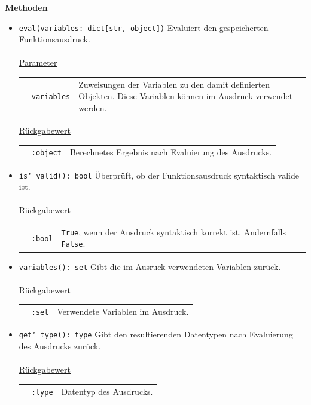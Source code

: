\documentclass{article}
\begin{document}
\textbf{{Methoden}}
\begin{itemize}
\item \texttt{eval(variables: dict[str, object])} \newline Evaluiert den gespeicherten Funktionsausdruck.
\\\\
\underline{{Parameter}}

\begin{tabular}{lll}
 & \texttt{variables} & Zuweisungen der Variablen zu den damit definierten Objekten. Diese Variablen können im Ausdruck verwendet werden. \\
\end{tabular}

\underline{{Rückgabewert}}

\begin{tabular}{lll}
 & \texttt{:object} & Berechnetes Ergebnis nach Evaluierung des Ausdrucks. \\
\end{tabular}

\item \texttt{is\char`_valid(): bool} \newline Überprüft, ob der Funktionsausdruck syntaktisch valide ist.
\\\\
\underline{{Rückgabewert}}

\begin{tabular}{lll}
 & \texttt{:bool} & \texttt{True}, wenn der Ausdruck syntaktisch korrekt ist. Andernfalls \texttt{False}. \\
\end{tabular}

\item \texttt{variables(): set} \newline Gibt die im Ausruck verwendeten Variablen zurück.
\\\\
\underline{{Rückgabewert}}

\begin{tabular}{lll}
 & \texttt{:set} & Verwendete Variablen im Ausdruck. \\
\end{tabular}

\item \texttt{get\char`_type(): type} \newline Gibt den resultierenden Datentypen nach Evaluierung des Ausdrucks zurück.
\\\\
\underline{{Rückgabewert}}

\begin{tabular}{lll}
 & \texttt{:type} & Datentyp des Ausdrucks. \\
\end{tabular}
\end{itemize}
\end{document}
